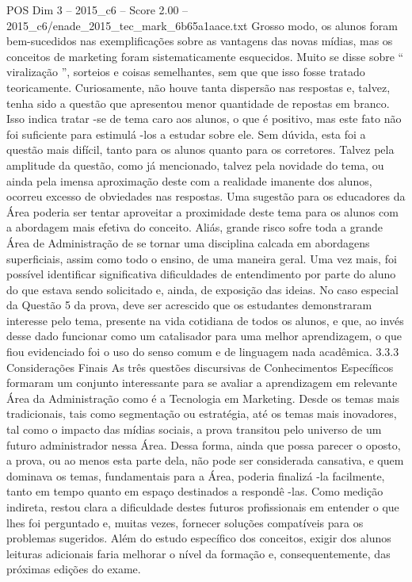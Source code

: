 \begin{textsample}{POS Dim 3 – 2015\_c6 – Score 2.00 – 2015\_c6/enade\_2015\_tec\_mark\_6b65a1aace.txt}
Grosso modo, os alunos foram bem-sucedidos nas exemplificações sobre as vantagens das novas mídias, mas os conceitos de marketing foram sistematicamente esquecidos.
Muito se disse sobre “ viralização ”, sorteios e coisas semelhantes, sem que que isso fosse tratado teoricamente.
Curiosamente, não houve tanta dispersão nas respostas e, talvez, tenha sido a questão que apresentou menor quantidade de repostas em branco.
Isso indica tratar -se de tema caro aos alunos, o que é positivo, mas este fato não foi suficiente para estimulá -los a estudar sobre ele.
Sem dúvida, esta foi a questão mais difícil, tanto para os alunos quanto para os corretores.
Talvez pela amplitude da questão, como já mencionado, talvez pela novidade do tema, ou ainda pela imensa aproximação deste com a realidade imanente dos alunos, ocorreu excesso de obviedades nas respostas.
Uma sugestão para os educadores da Área poderia ser tentar aproveitar a proximidade deste tema para os alunos com a abordagem mais efetiva do conceito.
Aliás, grande risco sofre toda a grande Área de Administração de se tornar uma disciplina calcada em abordagens superficiais, assim como todo o ensino, de uma maneira geral.
Uma vez mais, foi possível identificar significativa dificuldades de entendimento por parte do aluno do que estava sendo solicitado e, ainda, de exposição das ideias.
No caso especial da Questão 5 da prova, deve ser acrescido que os estudantes demonstraram interesse pelo tema, presente na vida cotidiana de todos os alunos, e que, ao invés desse dado funcionar como um catalisador para uma melhor aprendizagem, o que fiou evidenciado foi o uso do senso comum e de linguagem nada acadêmica. 3.3.3 Considerações Finais As três questões discursivas de Conhecimentos Específicos formaram um conjunto interessante para se avaliar a aprendizagem em relevante Área da Administração como é a Tecnologia em Marketing.
Desde os temas mais tradicionais, tais como segmentação ou estratégia, até os temas mais inovadores, tal como o impacto das mídias sociais, a prova transitou pelo universo de um futuro administrador nessa Área.
Dessa forma, ainda que possa parecer o oposto, a prova, ou ao menos esta parte dela, não pode ser considerada cansativa, e quem dominava os temas, fundamentais para a Área, poderia finalizá -la facilmente, tanto em tempo quanto em espaço destinados a respondê -las.
Como medição indireta, restou clara a dificuldade destes futuros profissionais em entender o que lhes foi perguntado e, muitas vezes, fornecer soluções compatíveis para os problemas sugeridos.
Além do estudo específico dos conceitos, exigir dos alunos leituras adicionais faria melhorar o nível da formação e, consequentemente, das próximas edições do exame.

\end{textsample}
